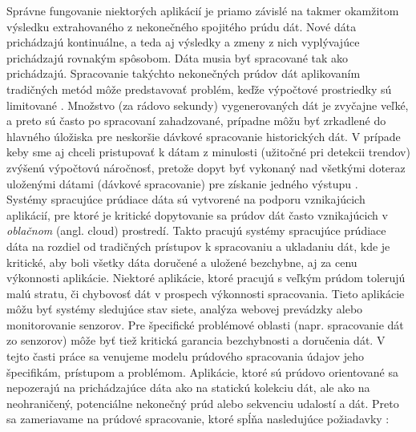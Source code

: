 Správne fungovanie niektorých aplikácií je priamo závislé na takmer okamžitom výsledku extrahovaného z nekonečného spojitého prúdu dát. Nové dáta prichádzajú kontinuálne, a teda aj výsledky a zmeny z nich vyplývajúce prichádzajú rovnakým spôsobom. Dáta musia byť spracované tak ako prichádzajú. 
Spracovanie takýchto nekonečných prúdov dát aplikovaním tradičných metód môže predstavovať problém, keďže výpočtové prostriedky sú limitované \citep{babcock2002models}. 
Množstvo (za rádovo sekundy) vygenerovaných dát je zvyčajne veľké, a preto sú často po spracovaní zahadzované, prípadne môžu byť zrkadlené do hlavného úložiska pre neskoršie dávkové spracovanie historických dát. 
V prípade keby sme aj chceli pristupovať k dátam z minulosti (užitočné pri detekcii trendov) zvýšenú výpočtovú náročnosť, pretože dopyt byť vykonaný nad všetkými doteraz uloženými dátami (dávkové spracovanie) pre získanie jedného výstupu \citep{silvestri2006distributed}. 
\\[5pt]
Systémy spracujúce prúdiace dáta sú vytvorené na podporu vznikajúcich aplikácií, pre ktoré je kritické dopytovanie sa prúdov dát často vznikajúcich v \textit{oblačnom} (angl. cloud) prostredí. Takto pracujú systémy spracujúce prúdiace dáta na rozdiel od tradičných prístupov k spracovaniu a ukladaniu dát, kde je kritické, aby boli všetky dáta doručené a uložené bezchybne, aj za cenu výkonnosti aplikácie. 
Niektoré aplikácie, ktoré pracujú s veľkým prúdom tolerujú malú stratu, či chybovosť dát v prospech výkonnosti spracovania. 
Tieto aplikácie môžu byť systémy sledujúce stav siete, analýza webovej prevádzky alebo monitorovanie senzorov. 
Pre špecifické problémové oblasti (napr. spracovanie dát zo senzorov) môže byť tiež kritická garancia bezchybnosti a doručenia dát. 
V tejto časti práce sa venujeme modelu prúdového spracovania údajov jeho špecifikám, prístupom a problémom. 
Aplikácie, ktoré sú prúdovo orientované sa nepozerajú na prichádzajúce dáta ako na statickú kolekciu dát, ale ako na neohraničený, potenciálne nekonečný prúd alebo sekvenciu udalostí a dát. Preto sa zameriavame na prúdové spracovanie, ktoré spĺňa nasledujúce požiadavky \citep{stonebraker20058}:
